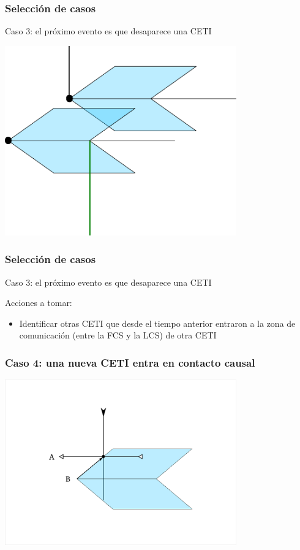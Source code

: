 \documentclass[handout]{beamer}
\theoremstyle{plain}
\theoremstyle{definition}
\theoremstyle{remark}
\begin{document}
\begin{frame}\frametitle{Selección de casos}
   Caso 3: el próximo evento es que desaparece una CETI
   \bigskip

\centering
\includegraphics[width=0.75\textwidth]{path5908-5-8-9.png}
\end{frame}
             
\begin{frame}\frametitle{Selección de casos}
   Caso 3: el próximo evento es que desaparece una CETI

   Acciones a tomar:

   \begin{itemize}
      \item Identificar otras CETI que desde el tiempo anterior
         entraron a la zona de comunicación (entre la FCS y la LCS) de
         otra CETI
   \end{itemize}
\end{frame}
 
\begin{frame}\frametitle{Caso 4: una nueva CETI entra en contacto causal}
   \centering
   \includegraphics[width=0.75\textwidth]{C4.png}
\end{frame}  %
\end{document}
